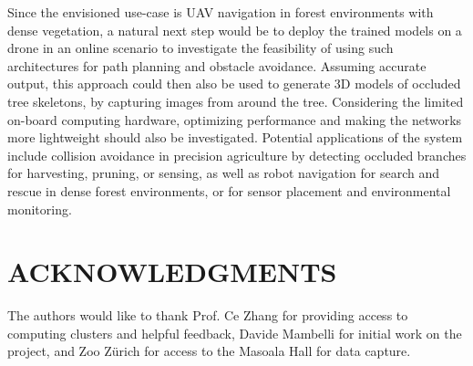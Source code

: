 Since the envisioned use-case is UAV navigation in forest environments with dense vegetation, a natural next step would be to deploy the trained models on a drone in an online scenario to investigate the feasibility of using such architectures for path planning and obstacle avoidance. Assuming accurate output, this approach could then also be used to generate 3D models of occluded tree skeletons, by capturing images from around the tree. Considering the limited on-board computing hardware, optimizing performance and making the networks more lightweight should also be investigated. Potential applications of the system include collision avoidance in precision agriculture by detecting occluded branches for harvesting, pruning, or sensing, as well as robot navigation for search and rescue in dense forest environments, or for sensor placement and environmental monitoring. 






\section*{ACKNOWLEDGMENTS}

The authors would like to thank Prof. Ce Zhang for 
providing access to computing clusters and helpful feedback, Davide Mambelli for initial work on the project, and Zoo Zürich for access to the Masoala Hall for data capture.

